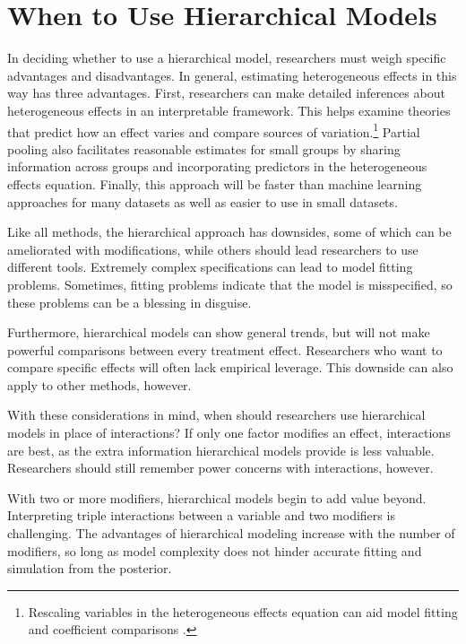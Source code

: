 \documentclass[12pt]{article}
\begin{document}
\section{When to Use Hierarchical Models}

In deciding whether to use a hierarchical model, researchers must weigh specific advantages and disadvantages. 
In general, estimating heterogeneous effects in this way has three advantages.
First, researchers can make detailed inferences about heterogeneous effects in an interpretable framework. 
This helps examine theories that predict how an effect varies and compare sources of variation.\footnote{Rescaling variables in the heterogeneous effects equation can aid model fitting and coefficient comparisons \citep{Gelman2008}.} 
Partial pooling also facilitates reasonable estimates for small groups by sharing information across groups and incorporating predictors in the heterogeneous effects equation. 
Finally, this approach will be faster than machine learning approaches for many datasets as well as easier to use in small datasets.


Like all methods, the hierarchical approach has downsides, some of which can be ameliorated with modifications, while others should lead researchers to use different tools. 
Extremely complex specifications can lead to model fitting problems.
Sometimes, fitting problems indicate that the model is misspecified, so these problems can be a blessing in disguise.


Furthermore, hierarchical models can show general trends, but will not make powerful comparisons between every treatment effect. 
Researchers who want to compare specific effects will often lack empirical leverage.
This downside can also apply to other methods, however. 


With these considerations in mind, when should researchers use hierarchical models in place of interactions?
If only one factor modifies an effect, interactions are best, as the extra information hierarchical models provide is less valuable. 
Researchers should still remember power concerns with interactions, however. 


With two or more modifiers, hierarchical models begin to add value beyond. 
Interpreting triple interactions between a variable and two modifiers is challenging. 
The advantages of hierarchical modeling increase with the number of modifiers, so long as model complexity does not hinder accurate fitting and simulation from the posterior. 
\end{document}

